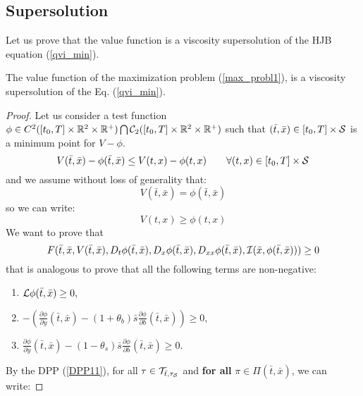 \subsection{Supersolution}

Let us prove that the value function is a viscosity supersolution of the HJB equation (\ref{qvi_min}). 

\begin{Theorem}\label{supersolution_th}
 The value function of the maximization problem (\ref{max_probl1}), is a viscosity supersolution of the Eq. (\ref{qvi_min}).
\end{Theorem}

\begin{proof}
Let us consider a test function $ \phi \in C^2([t_0,T] \times \mathbb{R}^2\times \mathbb{R}^+) \bigcap \mathcal{C}_2([t_0,T] \times \mathbb{R}^2\times \mathbb{R}^+)$ such that 
$(\bar t,\bar x) \in [t_0,T] \times \mathcal{S}$  is a minimum point for $V-\phi$.\\
\begin{equation}
 V(\bar t,\bar x) - \phi(\bar t,\bar x) \leq V(t,x) - \phi(t, x) \hspace{2em} \forall (t,x) \in [t_0,T] \times \mathcal{S}
\end{equation}
and we assume without loss of generality that:
\begin{equation}\label{min_point}
V(\bar t,\bar x) = \phi(\bar t,\bar x)  
\end{equation}
so we can write:
\begin{equation}\label{min_point2}
V(t,x) \geq \phi(t, x) 
\end{equation}
We want to prove that
$$ F(\bar t,\bar x,V(\bar t, \bar x),D_t \phi(\bar t, \bar x),D_x \phi(\bar t, \bar x),D_{xx}\phi(\bar t, \bar x),
\mathcal{I}(\bar x,\phi(\bar t, \bar x))) \geq 0  $$
that is analogous to prove that all the following terms are non-negative:
\begin{enumerate}
 \item 
 $ \mathcal{L} \phi(\bar t, \bar x) \geq 0 ,$
 \item $-\left(\frac{\partial \phi}{\partial y}(\bar t, \bar x)
 -(1+\theta_b) \bar s \frac{\partial \phi}{\partial b}(\bar t, \bar x)\right) \geq 0,$
 \item $\frac{\partial \phi}{\partial y}(\bar t, \bar x)-(1-\theta_s) \bar s \frac{\partial \phi}{\partial b}(\bar t, \bar x) \geq 0.$
\end{enumerate}
By the DPP (\ref{DPP11}), for all $\tau \in \mathcal{T}_{\bar t,\tau_{\mathcal{S}}}$ and \textbf{for all} $\pi \in \Pi(\bar t, \bar x)$, we can write:

\end{proof}
